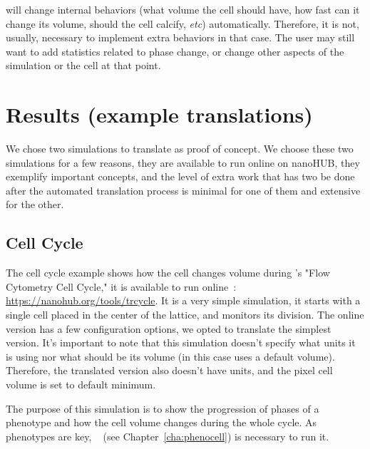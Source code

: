 \pcps will change internal behaviors (what volume the cell should have, how fast can it change its volume, should the cell calcify, \textit{etc}) automatically. Therefore, it is not, usually, necessary to implement extra behaviors in that case. The user may still want to add statistics related to phase change, or change other aspects of the simulation or the cell at that point.


\section{Results (example translations)}\label{sec:trans:examples}

We chose two \pscs simulations to translate as proof of concept. We choose these two simulations for a few reasons, they are available to run online on nanoHUB, they exemplify important \pcps concepts, and the level of extra work that has two be done after the automated translation process is minimal for one of them and extensive for the other.

\subsection{Cell Cycle}\label{sec:trans:examples:cycle}
The cell cycle example shows how the cell changes volume during \psc's "Flow Cytometry Cell Cycle," it is available to run online~\cite{kurtoglu_cycle_2020}: \url{https://nanohub.org/tools/trcycle}. It is a very simple simulation, it starts with a single cell placed in the center of the lattice, and monitors its division. The online version has a few configuration options, we opted to translate the simplest version. It's important to note that this simulation doesn't specify what units it is using nor what should be its volume (in this case \pscs uses a default volume). Therefore, the translated version also doesn't have units, and the pixel cell volume is set to default minimum.



The purpose of this simulation is to show the progression of phases of a \pscs phenotype and how the cell volume changes during the whole cycle. As phenotypes are key, \pcp~\cite{gianlupi_phenocellpy_2023} (see Chapter~\ref{cha:phenocell}) is necessary to run it. 


